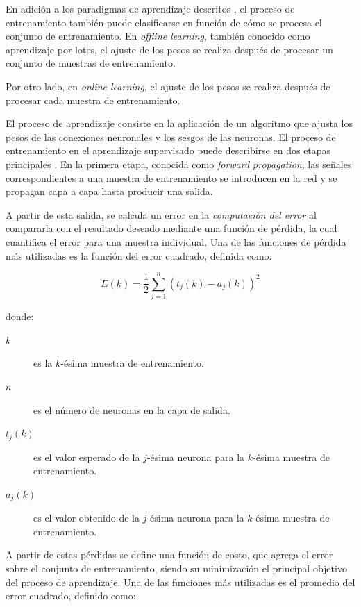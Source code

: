 En adición a los paradigmas de aprendizaje descritos \parencite[pp.~26--27]{da2016artificial}, el proceso de entrenamiento también
puede clasificarse en función de cómo se procesa el conjunto de entrenamiento.
En \textit{offline learning}, también conocido como aprendizaje por lotes, el
ajuste de los pesos se realiza después de procesar un conjunto de muestras de
entrenamiento.
\medskip

Por otro lado, en \textit{online learning}, el ajuste de los pesos se realiza
después de procesar cada muestra de entrenamiento.

\medskip


El proceso de aprendizaje consiste en la aplicación de un algoritmo que ajusta los
pesos de las conexiones neuronales y los sesgos de las neuronas. El proceso de entrenamiento 
en el aprendizaje supervisado puede describirse en dos
etapas principales \parencite[p.57]{da2016artificial}. En la primera etapa, conocida como \textit{forward propagation},
las señales correspondientes a una muestra de entrenamiento se introducen en la red
y se propagan capa a capa hasta producir una salida.
\medskip

A partir de esta salida, se calcula un error en la \textit{computación del error} al compararla
 con el resultado deseado
mediante una función de pérdida, la cual cuantifica el error para una muestra
individual. Una de las funciones de pérdida más utilizadas es la función del error cuadrado,
definida como:

\begin{equation}
    E(k)=\frac{1}{2}\sum_{j=1}^{n}(t_{j}(k)-a_{j}(k))^{2}
    \label{eq:error}
\end{equation}

donde:

\begin{description}
    \item[$k$] es la $k$-ésima muestra de entrenamiento.
    \item[$n$] es el número de neuronas en la capa de salida.
    \item[$t_{j}(k)$] es el valor esperado de la $j$-ésima neurona para la $k$-ésima
    muestra de entrenamiento.
    \item[$a_{j}(k)$] es el valor obtenido de la $j$-ésima neurona para la $k$-ésima
    muestra de entrenamiento.
\end{description}

A partir de estas pérdidas se define una función de costo, que agrega
el error sobre el conjunto de entrenamiento, siendo su minimización el principal
objetivo del proceso de aprendizaje. Una de las funciones más utilizadas es el
promedio del error cuadrado, definido como:


